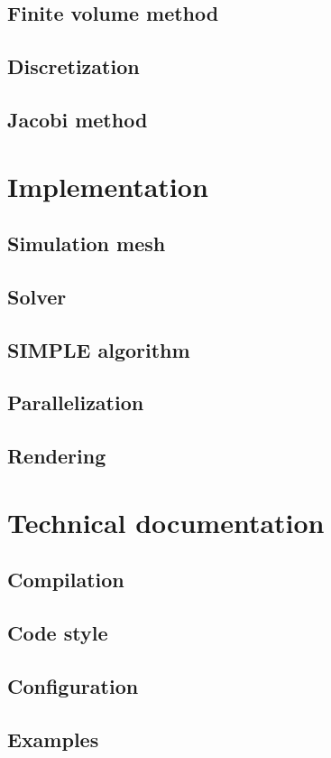 \documentclass[12pt]{article}
\begin{document}
\subsection{Finite volume method}

\subsection{Discretization}

\subsection{Jacobi method}

\section{Implementation}

\subsection{Simulation mesh}

\subsection{Solver}

\subsection{SIMPLE algorithm}

\subsection{Parallelization}

\subsection{Rendering}

\section{Technical documentation}

\subsection{Compilation}

\subsection{Code style}

\subsection{Configuration}

\subsection{Examples}

\begin{thebibliography}{9}


\end{thebibliography}
\end{document}

